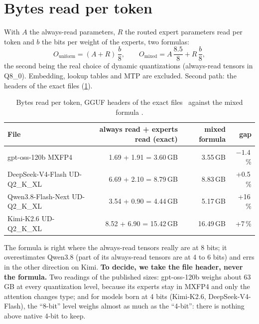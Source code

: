 \section{Bytes read per token}\label{sec:octets-jeton}

With $A$ the always-read parameters, $R$ the routed expert parameters read per token and $b$ the bits per weight of the experts, two formulas:
\begin{equation}\label{eq:octets-jeton}
O_{\text{uniform}} = (A + R)\,\frac{b}{8}, \qquad O_{\text{mixed}} = A\,\frac{8.5}{8} + R\,\frac{b}{8},
\end{equation}
the second being the real choice of dynamic quantizations (always-read tensors in Q8\_0). Embedding, lookup tables and MTP are excluded. Second path: the headers of the exact files (\cref{tab:octets-fichiers}).

\begin{table}[ht]
\centering\small
\caption[Bytes read per token: headers against formula]{Bytes read per token, GGUF headers of the exact files \mes~against the mixed formula \calc.}
\label{tab:octets-fichiers}
\begin{tabular}{@{}lrrr@{}}
\toprule
File & always read + experts read (exact) & mixed formula & gap \\
\midrule
gpt-oss-120b MXFP4 & 1.69 + 1.91 = 3.60\,GB & 3.55\,GB & $-1.4$\,\% \\
DeepSeek-V4-Flash UD-Q2\_K\_XL & 6.69 + 2.10 = 8.79\,GB & 8.83\,GB & +0.5\,\% \\
Qwen3.8-Flash-Next UD-Q2\_K\_XL & 3.54 + 0.90 = 4.44\,GB & 5.17\,GB & +16\,\% \\
Kimi-K2.6 UD-Q2\_K\_XL & 8.52 + 6.90 = 15.42\,GB & 16.49\,GB & +7\,\% \\
\bottomrule
\end{tabular}
\end{table}

The formula is right where the always-read tensors really are at 8 bits; it overestimates Qwen3.8 (part of its always-read tensors are at 4 to 6 bits) and errs in the other direction on Kimi. \textbf{To decide, we take the file header, never the formula.} Two readings of the published sizes: gpt-oss-120b weighs about 63\,GB at every quantization level, because its experts stay in MXFP4 and only the attention changes type; and for models born at 4 bits (Kimi-K2.6, DeepSeek-V4-Flash), the \enquote{8-bit} level weighs almost as much as the \enquote{4-bit}: there is nothing above native 4-bit to keep.


